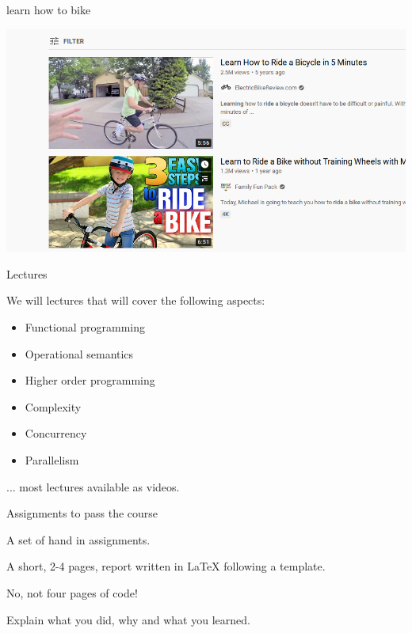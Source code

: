 \begin{frame}{learn how to bike}

  \pause
  \includegraphics[scale=0.6]{learn.png} 

\end{frame}

\begin{frame}{Lectures}

   We will lectures that will cover the following aspects:

  \begin{itemize}
    \item Functional programming
\pause
    \item Operational semantics
\pause
    \item Higher order programming
\pause
    \item Complexity 
\pause
    \item Concurrency 
\pause
    \item Parallelism
  \end{itemize}

\vspace{20pt}\hspace{40pt} ... most lectures available as videos.  

\end{frame}

\begin{frame}{Assignments to pass the course}

  A set of hand in assignments.

  \vspace{20pt}\pause
  A short, 2-4 pages, report written in LaTeX following a template.

  \vspace{20pt}\pause
  No, not four pages of code!

  \vspace{20pt}\pause
  Explain what you did, why and what you learned.

\end{frame}


